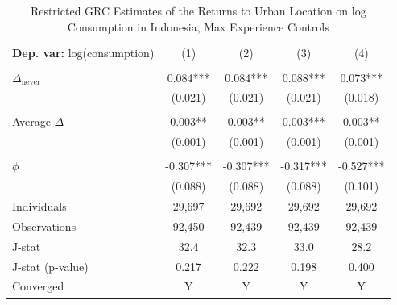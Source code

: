 \begin{table}[htbp] \centering \begin{threeparttable}
 \caption{Restricted GRC Estimates of the Returns to Urban Location on log Consumption in Indonesia, Max Experience Controls} 
 \label{tab:GRC_IDN_consumption_urban_unb_exp_max} 
\begin{tabular}{l cccc} \toprule  \textbf{Dep. var:}  log(consumption) 
                    &\multicolumn{1}{c}{(1)}   &\multicolumn{1}{c}{(2)}   &\multicolumn{1}{c}{(3)}   &\multicolumn{1}{c}{(4)}   \\
                    &               &               &               &               \\
\addlinespace
$\Delta_{\text{never}}$&       0.084***&       0.084***&       0.088***&       0.073***\\
                    &     (0.021)   &     (0.021)   &     (0.021)   &     (0.018)   \\
                    &               &               &               &               \\
\addlinespace
Average $\Delta$    &       0.003** &       0.003** &       0.003***&       0.003** \\
                    &     (0.001)   &     (0.001)   &     (0.001)   &     (0.001)   \\
                    &               &               &               &               \\
\addlinespace
$\phi$              &      -0.307***&      -0.307***&      -0.317***&      -0.527***\\
                    &     (0.088)   &     (0.088)   &     (0.088)   &     (0.101)   \\
\addlinespace
Individuals         &      29,697   &      29,692   &      29,692   &      29,692   \\
Observations        &      92,450   &      92,439   &      92,439   &      92,439   \\
J-stat              &        32.4   &        32.3   &        33.0   &        28.2   \\
J-stat (p-value)    &       0.217   &       0.222   &       0.198   &       0.400   \\
Converged           &           Y   &           Y   &           Y   &           Y   \\

\end{tabular}
\end{threeparttable}
\end{table}
